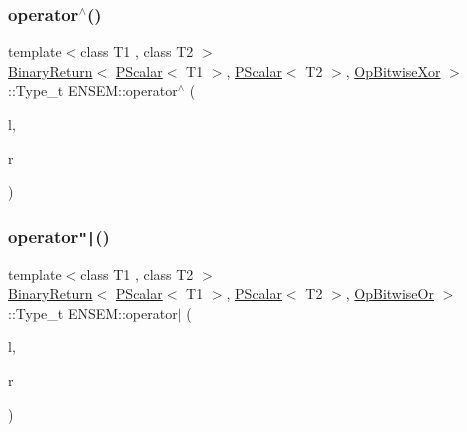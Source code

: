 \mbox{\label{group__primscalar_ga86ae67deb84332c9b2cadb6d1f7149f2}} 
\subsubsection{\texorpdfstring{operator$^\wedge$()}{operator^()}}
{\footnotesize\ttfamily template$<$class T1 , class T2 $>$ \\
\mbox{\hyperlink{structENSEM_1_1BinaryReturn}{Binary\+Return}}$<$ \mbox{\hyperlink{classENSEM_1_1PScalar}{P\+Scalar}}$<$ T1 $>$, \mbox{\hyperlink{classENSEM_1_1PScalar}{P\+Scalar}}$<$ T2 $>$, \mbox{\hyperlink{structENSEM_1_1OpBitwiseXor}{Op\+Bitwise\+Xor}} $>$\+::Type\+\_\+t E\+N\+S\+E\+M\+::operator$^\wedge$ (\begin{DoxyParamCaption}\item[{const \mbox{\hyperlink{classENSEM_1_1PScalar}{P\+Scalar}}$<$ T1 $>$ \&}]{l,  }\item[{const \mbox{\hyperlink{classENSEM_1_1PScalar}{P\+Scalar}}$<$ T2 $>$ \&}]{r }\end{DoxyParamCaption})\hspace{0.3cm}{\ttfamily [inline]}}

\mbox{\label{group__primscalar_ga246529f971eca0fda63267c9a68a51f7}} 
\subsubsection{\texorpdfstring{operator\texttt{"|}()}{operator|()}}
{\footnotesize\ttfamily template$<$class T1 , class T2 $>$ \\
\mbox{\hyperlink{structENSEM_1_1BinaryReturn}{Binary\+Return}}$<$ \mbox{\hyperlink{classENSEM_1_1PScalar}{P\+Scalar}}$<$ T1 $>$, \mbox{\hyperlink{classENSEM_1_1PScalar}{P\+Scalar}}$<$ T2 $>$, \mbox{\hyperlink{structENSEM_1_1OpBitwiseOr}{Op\+Bitwise\+Or}} $>$\+::Type\+\_\+t E\+N\+S\+E\+M\+::operator$\vert$ (\begin{DoxyParamCaption}\item[{const \mbox{\hyperlink{classENSEM_1_1PScalar}{P\+Scalar}}$<$ T1 $>$ \&}]{l,  }\item[{const \mbox{\hyperlink{classENSEM_1_1PScalar}{P\+Scalar}}$<$ T2 $>$ \&}]{r }\end{DoxyParamCaption})\hspace{0.3cm}{\ttfamily [inline]}}

